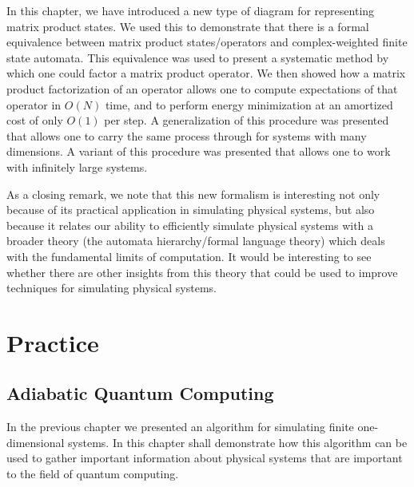 \documentclass[12pt]{amsbook}
\theoremstyle{plain}
\theoremstyle{definition}
\theoremstyle{remark}
\begin{document}
In this chapter, we have introduced a new type of diagram for representing matrix product states.  We used this to demonstrate that there is a formal equivalence between matrix product states/operators and complex-weighted finite state automata.  This equivalence was used to present a systematic method by which one could factor a matrix product operator.  We then showed how a matrix product factorization of an operator allows one to compute expectations of that operator in $O(N)$ time, and to perform energy minimization at an amortized cost of only $O(1)$ per step.  A generalization of this procedure was presented that allows one to carry the same process through for systems with many dimensions.  A variant of this procedure was presented that allows one to work with infinitely large systems.

As a closing remark, we note that this new formalism is interesting not only because of its practical application in simulating physical systems, but also because it relates our ability to efficiently simulate physical systems with a broader theory (the automata hierarchy/formal language theory) which deals with the fundamental limits of computation.  It would be interesting to see whether there are other insights from this theory that could be used to improve techniques for simulating physical systems.
\chapter{Practice}
\section{Adiabatic Quantum Computing}

In the previous chapter we presented an algorithm for simulating finite one-dimensional systems.  In this chapter shall demonstrate how this algorithm can be used to gather important information about physical systems that are important to the field of quantum computing.
\end{document}
